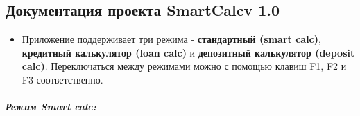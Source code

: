 \documentclass[
]{article}
\author{}
\date{}
\providecommand{\tightlist}{%
  \setlength{\itemsep}{0pt}\setlength{\parskip}{0pt}}
\begin{document}
\subsection{Документация проекта SmartCalcv
1.0}\label{ux434ux43eux43aux443ux43cux435ux43dux442ux430ux446ux438ux44f-ux43fux440ux43eux435ux43aux442ux430-smartcalcv-1.0}

\begin{itemize}
\tightlist
\item
  Приложение поддерживает три режима - \textbf{стандартный (smart
  calc)}, \textbf{кредитный калькулятор (loan calc)} и
  \textbf{депозитный калькулятор (deposit calc)}. Переключаться между
  режимами можно с помощью клавиш F1, F2 и F3 соответственно.
\end{itemize}

\subparagraph{Режим Smart
calc:}\label{ux440ux435ux436ux438ux43c-smart-calc}
\end{document}
